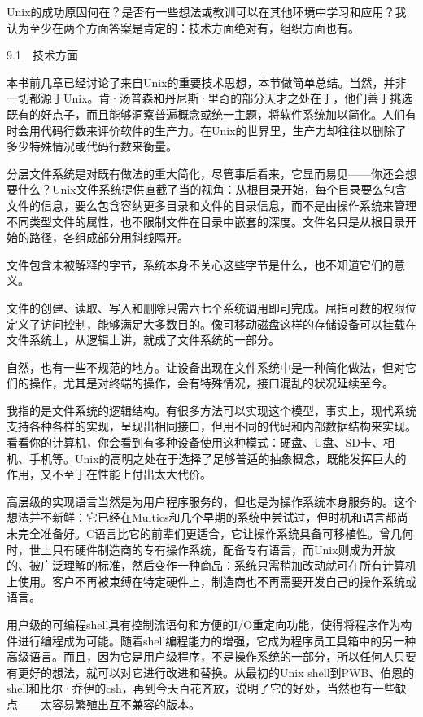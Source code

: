 \documentclass[a4paper,12pt,UTF8,twoside]{ctexbook}
\begin{document}
{{Unix的成功原因何在？是否有一些想法或教训可以在其他环境中学习和应用？我认为至少在两个方面答案是肯定的：技术方面绝对有，组织方面也有。





9.1　技术方面


本书前几章已经讨论了来自Unix的重要技术思想，本节做简单总结。当然，并非一切都源于Unix。肯·汤普森和丹尼斯·里奇的部分天才之处在于，他们善于挑选既有的好点子，而且能够洞察普遍概念或统一主题，将软件系统加以简化。人们有时会用代码行数来评价软件的生产力。在Unix的世界里，生产力却往往以删除了多少特殊情况或代码行数来衡量。

分层文件系统是对既有做法的重大简化，尽管事后看来，它显而易见——你还会想要什么？Unix文件系统提供直截了当的视角：从根目录开始，每个目录要么包含文件的信息，要么包含容纳更多目录和文件的目录信息，而不是由操作系统来管理不同类型文件的属性，也不限制文件在目录中嵌套的深度。文件名只是从根目录开始的路径，各组成部分用斜线隔开。

文件包含未被解释的字节，系统本身不关心这些字节是什么，也不知道它们的意义。

文件的创建、读取、写入和删除只需六七个系统调用即可完成。屈指可数的权限位定义了访问控制，能够满足大多数目的。像可移动磁盘这样的存储设备可以挂载在文件系统上，从逻辑上讲，就成了文件系统的一部分。

自然，也有一些不规范的地方。让设备出现在文件系统中是一种简化做法，但对它们的操作，尤其是对终端的操作，会有特殊情况，接口混乱的状况延续至今。

我指的是文件系统的逻辑结构。有很多方法可以实现这个模型，事实上，现代系统支持各种各样的实现，呈现出相同接口，但用不同的代码和内部数据结构来实现。看看你的计算机，你会看到有多种设备使用这种模式：硬盘、U盘、SD卡、相机、手机等。Unix的高明之处在于选择了足够普适的抽象概念，既能发挥巨大的作用，又不至于在性能上付出太大代价。

高层级的实现语言当然是为用户程序服务的，但也是为操作系统本身服务的。这个想法并不新鲜：它已经在Multics和几个早期的系统中尝试过，但时机和语言都尚未完全准备好。C语言比它的前辈们更适合，它让操作系统具备可移植性。曾几何时，世上只有硬件制造商的专有操作系统，配备专有语言，而Unix则成为开放的、被广泛理解的标准，然后变作一种商品：系统只需稍加改动就可在所有计算机上使用。客户不再被束缚在特定硬件上，制造商也不再需要开发自己的操作系统或语言。

用户级的可编程shell具有控制流语句和方便的I/O重定向功能，使得将程序作为构件进行编程成为可能。随着shell编程能力的增强，它成为程序员工具箱中的另一种高级语言。而且，因为它是用户级程序，不是操作系统的一部分，所以任何人只要有更好的想法，就可以对它进行改进和替换。从最初的Unix shell到PWB、伯恩的shell和比尔·乔伊的csh，再到今天百花齐放，说明了它的好处，当然也有一些缺点——太容易繁殖出互不兼容的版本。

}}
\end{document}
